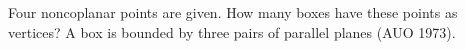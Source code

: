 Four noncoplanar points are given. How many boxes have these points as vertices? A box is bounded by three pairs of parallel planes (AUO 1973).

